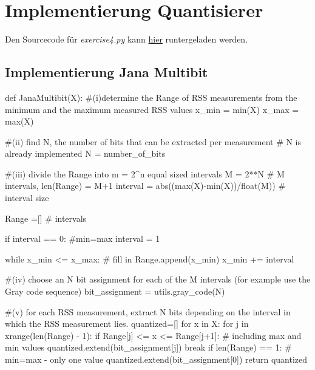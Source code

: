 \section{Implementierung Quantisierer}

Den Sourcecode für \textit{exercise4.py} kann 
\href{https://mega.nz/file/n4gH0Dqb#A4XA0epXKeL4Aj_91s-CNY_8qExiPM_iR3Iykt-WSUQ}
{hier} runtergeladen werden.

\subsection*{Implementierung Jana Multibit}
\begin{python}
	def JanaMultibit(X):
		#(i)determine the Range of RSS measurements from the minimum and the maximum measured RSS values
		x_min = min(X)
		x_max = max(X)

		#(ii) find N, the number of bits that can be extracted per measurement
		# N is already implemented
		N = number_of_bits

		#(iii) divide the Range into m = 2^n equal sized intervals
		M = 2**N	# M intervals, len(Range) = M+1
		interval = abs((max(X)-min(X))/float(M)) # interval size
		
		Range =[] 	# intervals
		
		if interval == 0:	#min=max
			interval = 1

		while x_min <= x_max:	# fill in
			Range.append(x_min) 
			x_min += interval

		#(iv) choose an N bit assignment for each of the M intervals (for example use the Gray code sequence) 
		bit_assignment = utils.gray_code(N)

		#(v) for each RSS measurement, extract N bits depending on the interval in which the RSS measurement lies. 
		quantized=[]
		for x in X:
			for j in xrange(len(Range) - 1):
				if Range[j] <= x <= Range[j+1]: # including max and min values
					quantized.extend(bit_assignment[j])
					break
			if len(Range) == 1:	# min=max - only one value
				quantized.extend(bit_assignment[0])
		return quantized
\end{python}
